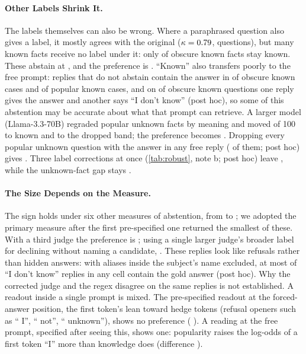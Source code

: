 \documentclass[manuscript,screen,review,anonymous,nonacm]{acmart}
\newcommand{\idk}{``I don't know''}
\begin{document}
\paragraph{Other Labels Shrink It.} The labels themselves can also be wrong. Where a paraphrased question also gives a label, it mostly agrees with the original ($\kappa=0.79$, \lcBothN{} questions), but many known facts receive no label under it: only \eoObsKnownN{} of \gsObsKnownTotal{} obscure known facts stay known. These abstain at \eoObsKnown, and the preference is \eoDiff{} \eoDiffCI. ``Known'' also transfers poorly to the free prompt: replies that do not abstain contain the answer in \ecNonAbs{} of obscure known cases and \ecPopKnown{} of popular known cases, and on \ecBoth{} of \ecBothOf{} obscure known questions one reply gives the answer and another says \idk{} (post hoc), so some of this abstention may be accurate about what that prompt can retrieve. A larger model (Llama-3.3-70B) regraded popular unknown facts by meaning and moved \sePUKnown{} of 100 to known and \sePUInter{} to the dropped band; the preference becomes \seDiff{} \seDiffCI. Dropping every popular unknown question with the answer in any free reply (\lcPUAlias{} of them; post hoc) gives \lcAliasDrop{} \lcAliasDropCI. Three label corrections at once (\cref{tab:robust}, note b; post hoc) leave \rcJoint{} \rcJointCI, while the unknown-fact gap stays \rcUnkJoint{} \rcUnkJointCI.

\paragraph{The Size Depends on the Measure.} The sign holds under six other measures of abstention, from \hjLlamaDiff{} to \faLlamaRegexDiff; we adopted the primary measure after the first pre-specified one returned the smallest of these. With a third judge the preference is \tjLlamaDiff; using a single larger judge's broader label for declining without naming a candidate, \sdDiff{} \sdDiffCI. These replies look like refusals rather than hidden answers: with aliases inside the subject's name excluded, at most \lcDKAliasMax{} of \idk{} replies in any cell contain the gold answer (post hoc). Why the corrected judge and the regex disagree on the same replies is not established. A readout inside a single prompt is mixed. The pre-specified readout at the forced-answer position, the first token's lean toward hedge tokens (refusal openers such as `` I'', `` not'', `` unknown''), shows no preference (\loLlamaDiff{} \loLlamaDiffCI). A reading at the free prompt, specified after seeing this, shows one: popularity raises the log-odds of a first token ``I'' more than knowledge does (difference \eoFreeIDiff{} \eoFreeIDiffCI).
\end{document}
